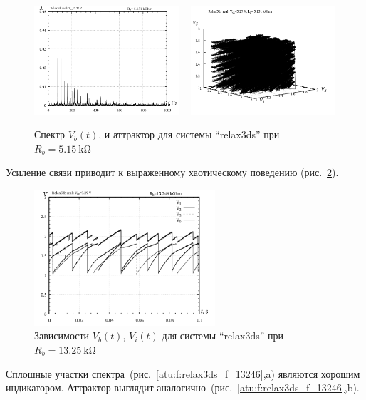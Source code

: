 \begin{figure}[htb!]
  \centerline{
    \includegraphics[width=0.48\textwidth]{p/relax3ds_f_005151.png}
    ~
    \includegraphics[width=0.48\textwidth]{p/relax3ds_v1v2v3_005151.png}
  }
  \caption{Спектр $V_b(t)$, и аттрактор для системы ``relax3ds'' при $R_b=\SI{5.15}{\kilo\ohm}$ }
  \label{atu:f:relax3ds_f_05151}
\end{figure}

Усиление связи приводит к выраженному хаотическому поведению
(рис.~\ref{atu:f:relax3ds_t_13246}).

\begin{figure}[htb!]
  \centerline{\includegraphics[width=0.6\textwidth]{p/relax3ds_t_013246.png} }
  \caption{Зависимости $V_b(t)$, $V_i(t)$ для системы ``relax3ds'' при $R_b=\SI{13.25}{\kilo\ohm}$ }
  \label{atu:f:relax3ds_t_13246}
\end{figure}

Сплошные участки спектра~(рис.~\ref{atu:f:relax3ds_f_13246},a)
являются хорошим индикатором.
Аттрактор выглядит аналогично~(рис.~\ref{atu:f:relax3ds_f_13246},b).

